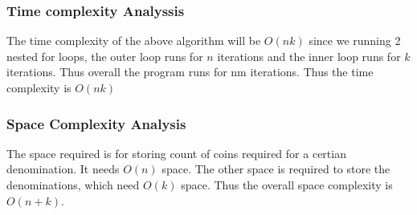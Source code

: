 \documentclass{article}
\begin{document}
\subsubsection{Time complexity Analyssis}
The time complexity of the above algorithm will be $O(nk)$ since we running 2 nested for loops, the outer loop runs for $n$ iterations and the inner loop runs for $k$  iterations. Thus overall the program runs for nm iterations. Thus the time complexity is $O(nk)$
\subsubsection{Space Complexity Analysis}
The space required is for storing count of coins required for a certian denomination. It needs $O(n)$ space. The other space is required to store the denominations, which need $O(k)$ space. Thus the overall space complexity is $O(n+k)$.
\end{document}
